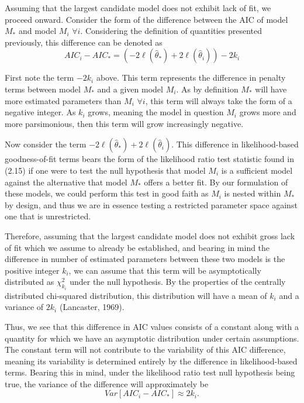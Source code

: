 		Assuming that the largest candidate model does not exhibit lack of fit, we proceed onward. Consider the form of the difference between the AIC of model $M_*$
		and model $M_i$ $\forall i$. Considering the definition of quantities presented previously, this difference can be denoted as
		\begin{equation}
			AIC_i - AIC_* = \left( -2 \ell (\hat{\theta}_*) + 2 \ell (\hat{\theta}_i) \right) - 2k_i
		\end{equation}

		First note the term $-2k_i$ above. This term represents the difference in penalty terms between model $M_*$ and a given model $M_i$. As by definition
		$M_*$ will have more estimated parameters than $M_i$ $\forall i$, this term will always take the form of a negative integer. As $k_i$ grows, meaning
		the model in question $M_i$ grows more and more parsimonious, then this term will grow increasingly negative.

		Now consider the term $-2 \ell (\hat{\theta}_*) + 2 \ell (\hat{\theta}_i)$. This difference in likelihood-based goodness-of-fit terms bears the form
		of the likelihood ratio test statistic found in (2.15) if one were to test the null hypothesis that model $M_i$ is a sufficient model against the alternative that
		model $M_*$ offers a better fit. By our formulation of these models, we could perform this test in good faith as $M_i$ is nested within $M_*$ by 
		design, and thus we are in essence testing a restricted parameter space against one that is unrestricted.

		Therefore, assuming that the largest candidate model does not exhibit gross lack of fit which we assume to already be established, and bearing in mind the
		difference in number of estimated parameters between these two models is the positive integer $k_i$, we can assume that this term will be asymptotically distributed as
		$\chi^2_{k_i}$ under the null hypothesis. By the properties of the centrally distributed chi-squared distribution, this distribution will have a mean of $k_i$ and
		a variance of $2 k_i$ (Lancaster, 1969).

		Thus, we see that this difference in AIC values consists of a constant along with a quantity for which we have an asymptotic distribution under certain
		assumptions. The constant term will not contribute to the variability of this AIC difference, meaning its variability is determined entirely by the
		difference in likelihood-based terms. Bearing this in mind, under the likelihood ratio test null hypothesis being true, the variance of the difference
		will approximately be
		\begin{equation}
			Var[AIC_i - AIC_*] \approx 2 k_i .
		\end{equation}

